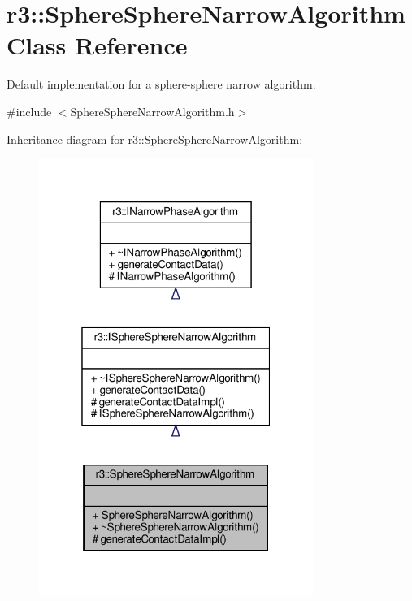 \hypertarget{classr3_1_1_sphere_sphere_narrow_algorithm}{}\section{r3\+:\+:Sphere\+Sphere\+Narrow\+Algorithm Class Reference}
\label{classr3_1_1_sphere_sphere_narrow_algorithm}


Default implementation for a sphere-\/sphere narrow algorithm.  




{\ttfamily \#include $<$Sphere\+Sphere\+Narrow\+Algorithm.\+h$>$}



Inheritance diagram for r3\+:\+:Sphere\+Sphere\+Narrow\+Algorithm\+:\nopagebreak
\begin{figure}[H]
\begin{center}
\leavevmode
\includegraphics[width=253pt]{classr3_1_1_sphere_sphere_narrow_algorithm__inherit__graph}
\end{center}
\end{figure}


